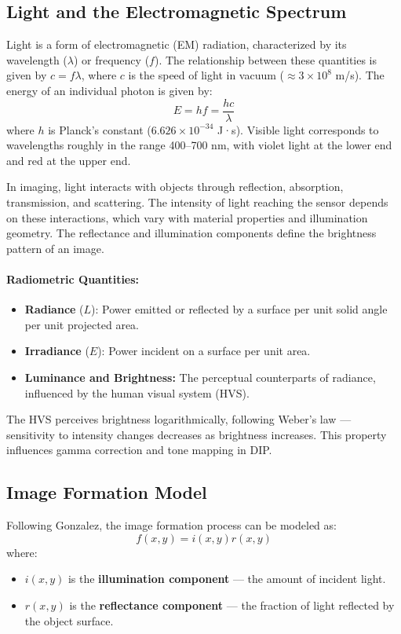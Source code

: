 \documentclass[12pt,a4paper]{AnantDocumentation}
\begin{document}
\subsection{Light and the Electromagnetic Spectrum}
Light is a form of electromagnetic (EM) radiation, characterized by its wavelength ($\lambda$) or frequency ($f$). The relationship between these quantities is given by $c = f\lambda$, where $c$ is the speed of light in vacuum ($\approx 3 \times 10^8$ m/s). The energy of an individual photon is given by:
\begin{equation}
E = hf = \frac{hc}{\lambda}
\end{equation}
where $h$ is Planck’s constant ($6.626 \times 10^{-34}$ J·s). Visible light corresponds to wavelengths roughly in the range 400–700 nm, with violet light at the lower end and red at the upper end.

In imaging, light interacts with objects through reflection, absorption, transmission, and scattering. The intensity of light reaching the sensor depends on these interactions, which vary with material properties and illumination geometry. The reflectance and illumination components define the brightness pattern of an image.

\paragraph{Radiometric Quantities:}
\begin{itemize}
\item \textbf{Radiance} ($L$): Power emitted or reflected by a surface per unit solid angle per unit projected area.
\item \textbf{Irradiance} ($E$): Power incident on a surface per unit area.
\item \textbf{Luminance and Brightness:} The perceptual counterparts of radiance, influenced by the human visual system (HVS).
\end{itemize}

The HVS perceives brightness logarithmically, following Weber’s law — sensitivity to intensity changes decreases as brightness increases. This property influences gamma correction and tone mapping in DIP.

\subsection{Image Formation Model}
Following Gonzalez, the image formation process can be modeled as:
\begin{equation}
f(x, y) = i(x, y) r(x, y)
\end{equation}
where:
\begin{itemize}
\item $i(x, y)$ is the \textbf{illumination component} — the amount of incident light.
\item $r(x, y)$ is the \textbf{reflectance component} — the fraction of light reflected by the object surface.
\end{itemize}
\end{document}
